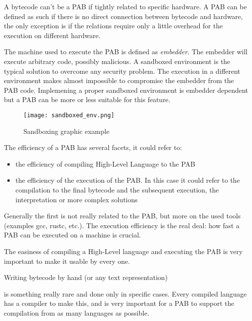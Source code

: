 \documentclass[../main.tex]{subfiles}
\begin{document}
\begin{description}[style=nextline]
  \item[Hardware Independence]
        A bytecode can't be a PAB if tightly related to specific hardware. A PAB can be defined as such if there is no direct connection between bytecode and hardware, the only exception is if the relations require only a little overhead for the execution on different hardware.

  \item[Sandboxing]
        The machine used to execute the PAB is defined as \textit{embedder}. The embedder will execute arbitrary code, possibly malicious.  A sandboxed environment is the typical solution to overcome any security problem. The execution in a different environment makes almost impossible to compromise the embedder from the PAB code. Implemening a proper sandboxed environment is embedder dependent but a PAB can be more or less suitable for this feature.

        \begin{figure}[h]
          \centering
          \texttt{[image: sandboxed\_env.png]}
          \caption{Sandboxing graphic example}
          \label{fig:Sandboxing graphic example}
        \end{figure}

  \item[Efficiency]
        The efficiency of a PAB has several facets, it could refer to:

        \begin{itemize}
          \item the efficiency of compiling High-Level Language to the PAB
          \item the efficiency of the execution of the PAB. In this case it could refer to the compilation to the final bytecode and the subsequent execution, the interpretation or more complex solutions
        \end{itemize}

        Generally the first is not really related to the PAB, but more on the used tools (examples gcc, rustc, etc.). The execution efficiency is the real deal: how fast a PAB can be executed on a machine is crucial.
  \item[Tool Simplicity]
        The easiness of compiling a High-Level language and  executing the PAB is very important to make it usable by every one.
  \item[Support as Compilation Target]
        Writing bytecode by hand (or any text representation) 


        is something really rare and done only in specific cases. Every compiled language has a compiler to make this, and is very important for a PAB to support the compilation from as many languages as possible.
\end{description}
\end{document}
